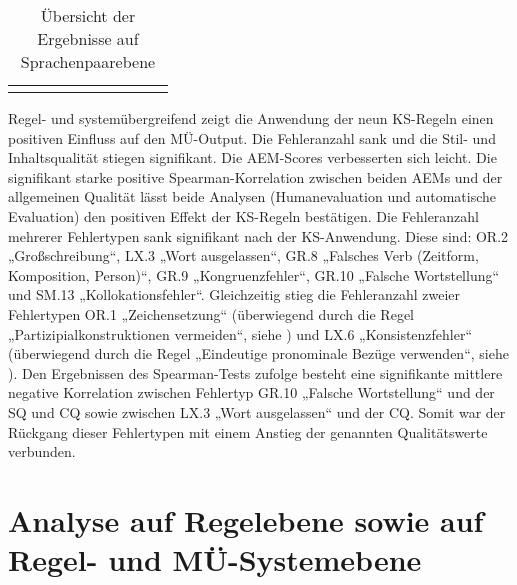\begin{sidewaystable}
\begin{tabularx}{\textwidth}{llllllllll}
\lspbottomrule
\end{tabularx}
\caption{\label{tab:05:22} Übersicht der Ergebnisse auf Sprachenpaarebene}
\end{sidewaystable}

Regel- und systemübergreifend zeigt die Anwendung der neun KS-Regeln einen positiven Einfluss auf den MÜ-Output. Die Fehleranzahl sank und die Stil- und Inhaltsqualität stiegen signifikant. Die AEM-Scores verbesserten sich leicht. Die signifikant starke positive Spearman-Korrelation zwischen beiden AEMs und der allgemeinen Qualität lässt beide Analysen (Humanevaluation und automatische Evaluation) den positiven Effekt der KS-Regeln bestätigen. Die Fehleranzahl mehrerer Fehlertypen sank signifikant nach der KS-Anwendung. Diese sind: OR.2 „Großschreibung“, LX.3 „Wort ausgelassen“, GR.8 „Falsches Verb (Zeitform, Komposition, Person)“, GR.9 „Kongruenzfehler“, GR.10 „Falsche Wortstellung“ und SM.13 „Kollokationsfehler“. Gleichzeitig stieg die Fehleranzahl zweier Fehlertypen OR.1 „Zeichensetzung“ (überwiegend durch die Regel „Partizipialkonstruktionen vermeiden“, siehe ) und LX.6 „Konsistenzfehler“ (überwiegend durch die Regel „Eindeutige pronominale Bezüge verwenden“, siehe ). Den Ergebnissen des Spearman-Tests zufolge besteht eine signifikante mittlere negative Korrelation zwischen Fehlertyp GR.10 „Falsche Wortstellung“ und der SQ und CQ sowie zwischen LX.3 „Wort ausgelassen“ und der CQ. Somit war der Rückgang dieser Fehlertypen mit einem Anstieg der genannten Qualitätswerte verbunden.


\section{\label{sec:5.3}Analyse auf Regelebene sowie auf Regel- und MÜ-Systemebene}

